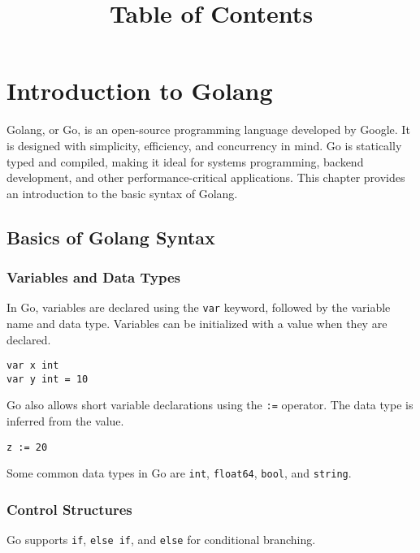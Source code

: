 \documentclass{article}
\title{Table of Contents}
\author{}
\date{}
\begin{document}
\maketitle

\tableofcontents

\section{Introduction to Golang}

Golang, or Go, is an open-source programming language developed by Google. It is designed with simplicity, efficiency, and concurrency in mind. Go is statically typed and compiled, making it ideal for systems programming, backend development, and other performance-critical applications. This chapter provides an introduction to the basic syntax of Golang.

\subsection{Basics of Golang Syntax}

\subsubsection{Variables and Data Types}

In Go, variables are declared using the \texttt{var} keyword, followed by the variable name and data type. Variables can be initialized with a value when they are declared.

\begin{verbatim}
var x int
var y int = 10
\end{verbatim}

Go also allows short variable declarations using the \texttt{:=} operator. The data type is inferred from the value.

\begin{verbatim}
z := 20
\end{verbatim}

Some common data types in Go are \texttt{int}, \texttt{float64}, \texttt{bool}, and \texttt{string}.

\subsubsection{Control Structures}

Go supports \texttt{if}, \texttt{else if}, and \texttt{else} for conditional branching.
\end{document}
